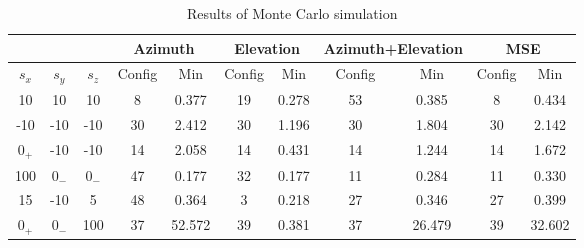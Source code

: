 \begin{table}[!htbp] %
	\begin{center}
		\begin{tabular}{ c c c |c c | c c | c c | c c }
			\toprule
			\multicolumn{3}{c|}{} & \multicolumn{2}{c|}{\textbf{Azimuth}} & \multicolumn{2}{c|}{\textbf{Elevation}} & \multicolumn{2}{c|}{\textbf{Azimuth+Elevation}} & \multicolumn{2}{c}{\textbf{MSE}}   \\
			\midrule
			\multicolumn{1}{c}{$s_x$} & $s_y$ & $s_z$ & Config & Min  & Config & Min & Config & Min & Config & Min \\
			\midrule
			\multirow{1}{*}{10} & 10 & 10 & 8 & 0.377 & 19 & 0.278 &  53 & 0.385 & 8  & 0.434\\
			\midrule
			\multirow{1}{*}{-10} & -10 & -10 & 30 & 2.412 & 30 & 1.196 &  30 & 1.804 & 30  & 2.142\\
			\midrule
			\multirow{1}{*}{$0_{+}$} & -10 & -10 & 14 & 2.058 & 14 & 0.431 & 14 & 1.244  & 14  & 1.672 \\
			\midrule
			\multirow{1}{*}{100} & $0_{-}$ & $0_{-}$ & 47 & 0.177 & 32 & 0.177  & 11 & 0.284  & 11  & 0.330 \\
			\midrule
			\multirow{1}{*}{15} & -10 & 5 & 48 & 0.364 & 3 & 0.218 & 27 & 0.346 & 27 & 0.399 \\
			\midrule
			\multirow{1}{*}{$0_{+}$} & $0_{-}$ & 100 & 37 & 52.572  & 39  & 0.381 & 37  & 26.479  & 39 & 32.602 \\
			\bottomrule 
		\end{tabular}
		\caption{Results of Monte Carlo simulation}
		\label{tab:montecarlo-best1}
	\end{center}
\end{table}

